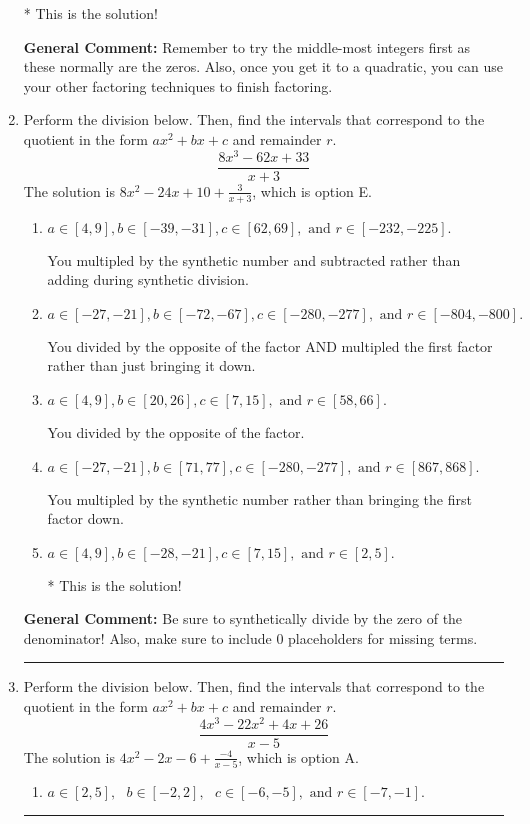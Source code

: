 \documentclass{extbook}[14pt]
\newcommand{\litem}[1]{\item #1

\rule{\textwidth}{0.4pt}}
\begin{document}
\begin{enumerate}
{\begin{enumerate}[label=\Alph*.]
* This is the solution!
\end{enumerate}

\textbf{General Comment:} Remember to try the middle-most integers first as these normally are the zeros. Also, once you get it to a quadratic, you can use your other factoring techniques to finish factoring.
}
\litem{
Perform the division below. Then, find the intervals that correspond to the quotient in the form $ax^2+bx+c$ and remainder $r$.
\[ \frac{8x^{3} -62 x + 33}{x + 3} \]The solution is \( 8x^{2} -24 x + 10 + \frac{3}{x + 3} \), which is option E.\begin{enumerate}[label=\Alph*.]
\item \( a \in [4, 9], b \in [-39, -31], c \in [62, 69], \text{ and } r \in [-232, -225]. \)

 You multipled by the synthetic number and subtracted rather than adding during synthetic division.
\item \( a \in [-27, -21], b \in [-72, -67], c \in [-280, -277], \text{ and } r \in [-804, -800]. \)

 You divided by the opposite of the factor AND multipled the first factor rather than just bringing it down.
\item \( a \in [4, 9], b \in [20, 26], c \in [7, 15], \text{ and } r \in [58, 66]. \)

 You divided by the opposite of the factor.
\item \( a \in [-27, -21], b \in [71, 77], c \in [-280, -277], \text{ and } r \in [867, 868]. \)

 You multipled by the synthetic number rather than bringing the first factor down.
\item \( a \in [4, 9], b \in [-28, -21], c \in [7, 15], \text{ and } r \in [2, 5]. \)

* This is the solution!
\end{enumerate}

\textbf{General Comment:} Be sure to synthetically divide by the zero of the denominator! Also, make sure to include 0 placeholders for missing terms.
}
\litem{
Perform the division below. Then, find the intervals that correspond to the quotient in the form $ax^2+bx+c$ and remainder $r$.
\[ \frac{4x^{3} -22 x^{2} +4 x + 26}{x -5} \]The solution is \( 4x^{2} -2 x -6 + \frac{-4}{x -5} \), which is option A.\begin{enumerate}[label=\Alph*.]
\item \( a \in [2, 5], \text{   } b \in [-2, 2], \text{   } c \in [-6, -5], \text{   and   } r \in [-7, -1]. \)


\end{enumerate}}
\end{enumerate}
\end{document}
